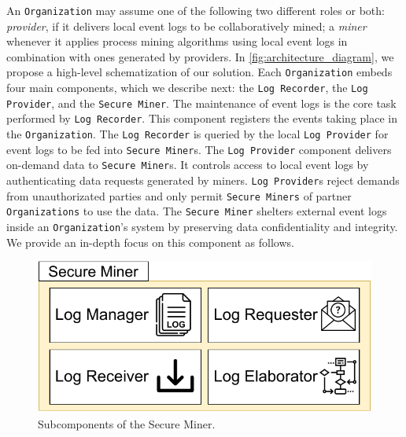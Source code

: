 An \texttt{Organization} may assume one of the following two different roles or both: \textit{provider}, if it delivers local event logs to be collaboratively mined; a \textit{miner} whenever it applies process mining algorithms using local event logs in combination with ones generated by providers. In \cref{fig:architecture_diagram}, we propose a high-level schematization of our solution. Each \texttt{Organization} embeds four main components, which we describe next: the \texttt{Log Recorder}, the \texttt{Log Provider}, and the \texttt{Secure Miner}. The maintenance of event logs is the core task performed by \texttt{Log Recorder}. This component registers the events taking place in the \texttt{Organization}. The \texttt{Log Recorder} is queried by the local \texttt{Log Provider} for event logs to be fed into \texttt{Secure Miner}s. The \texttt{Log Provider} component delivers on-demand data to \texttt{Secure Miner}s. It controls access to local event logs by authenticating data requests generated by miners. \texttt{Log Provider}s reject demands from unauthorizated parties and only permit \texttt{Secure Miners} of partner \texttt{Organizations} to use the data. The \texttt{Secure Miner} shelters external event logs inside an \texttt{Organization}'s system by preserving data confidentiality and integrity. We provide an in-depth focus on this component as follows.

\begin{figure}[t]
	\centering
	\includegraphics[width=0.6\linewidth]{content/figures/secureminer.pdf}
	\caption{Subcomponents of the Secure Miner.}
	\label{fig:trusted_miner}
\end{figure}




